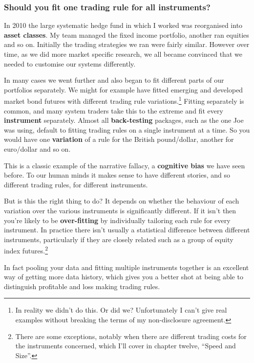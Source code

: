 \subsubsection*{Should you fit one trading rule for all instruments?}

In 2010 the large systematic hedge fund in which I worked was reorganised into \textbf{asset classes}. My team managed the fixed income portfolio, another ran equities and so on. Initially the trading strategies we ran were fairly similar. However over time, as we did more market specific research, we all became convinced that we needed to customise our systems differently.

In many cases we went further and also began to fit different parts of our portfolios separately. We might for example have fitted emerging and developed market bond futures with different trading rule variations.\footnote{In reality we didn't do this. Or did we? Unfortunately I can't give real examples without breaking the terms of my non-disclosure agreement.} Fitting separately is common, and many system traders take this to the extreme and fit every \textbf{instrument} separately. Almost all \textbf{back-testing} packages, such as the one Joe was using, default to fitting trading rules on a single instrument at a time. So you would have one \textbf{variation} of a rule for the British pound/dollar, another for euro/dollar and so on.

This is a classic example of the narrative fallacy, a \textbf{cognitive bias} we have seen before. To our human minds it makes sense to have different stories, and so different trading rules, for different instruments.

But is this the right thing to do? It depends on whether the behaviour of each variation over the various instruments is significantly different. If it isn't then you're likely to be \textbf{over-fitting} by individually tailoring each rule for every instrument. In practice there isn't usually a statistical difference between different instruments, particularly if they are closely related such as a group of equity index futures.\footnote{There are some exceptions, notably when there are different trading costs for the instruments concerned, which I'll cover in chapter twelve, ``Speed and Size''.}

In fact pooling your data and fitting multiple instruments together is an excellent way of getting more data history, which gives you a better shot at being able to distinguish profitable and loss making trading rules.

